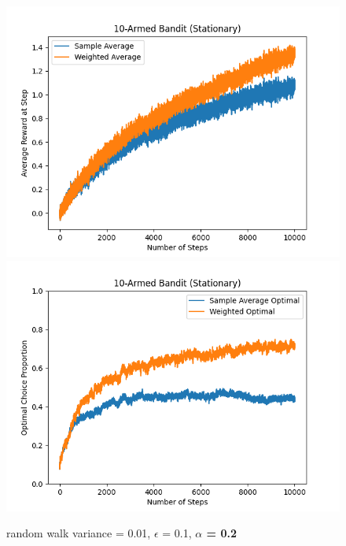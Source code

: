 \documentclass{article}
\begin{document}
\begin{figure}[h!]
\centering
\includegraphics[scale=.6]{RL_A1_pics/alpha/0.2.png}
\includegraphics[scale=.6]{RL_A1_pics/alpha/optimal/0.2.png}
\caption{random walk variance = 0.01, $\epsilon$ = 0.1, \textbf{$\alpha$ = 0.2}}
\label{fig:10-Armed1}
\end{figure}
\end{document}
